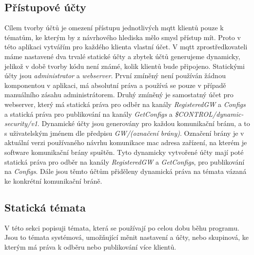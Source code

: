 \subsection{Přístupové účty}

Cílem tvorby účtů je omezení přístupu jednotlivých \acrshort{mqtt} klientů pouze k tématům, ke kterým by z návrhového hlediska mělo smysl přístup mít. Proto v této aplikaci vytvářím pro každého klienta vlastní účet. V \acrshort{mqtt} zprostředkovateli máme nastavené dva trvalé statické účty a zbytek účtů generujeme dynamicky, jelikož v době tvorby kódu není známé, kolik klientů bude připojeno. 
Statickými účty jsou \emph{administrator} a \emph{webserver}. První zmíněný není používán žádnou komponentou v aplikaci, má absolutní práva a používá se pouze v případě manuálního zásahu administrátorem. Druhý zmíněný je samostatný účet pro webserver, který má statická práva pro odběr na kanály \emph{RegisteredGW} a \emph{Configs} a statická práva pro publikování na kanály \emph{GetConfigs} a \emph{\$CONTROL/dynamic-security/v1}.
Dynamické účty jsou generovány pro každou komunikační bránu, a to s uživatelským jménem dle předpisu \emph{GW/(označení brány)}. Označení brány je v aktuální verzi používaného návrhu komunikace \acrshort{mac} adresa zařízení, na kterém je software komunikační brány spuštěn. Tyto dynamicky vytvořené účty mají poté statická práva pro odběr na kanály \emph{RegisteredGW} a \emph{GetConfigs}, pro publikování na \emph{Configs}. Dále jsou těmto účtům přiděleny dynamická práva na témata vázaná ke konkrétní komunikační bráně.

\subsection{Statická témata}

V této sekci popisuji témata, která se používají po celou dobu běhu programu. Jsou to témata systémová, umožňující měnit nastavení a účty, nebo skupinová, ke kterým má práva k odběru nebo publikování více klientů.

